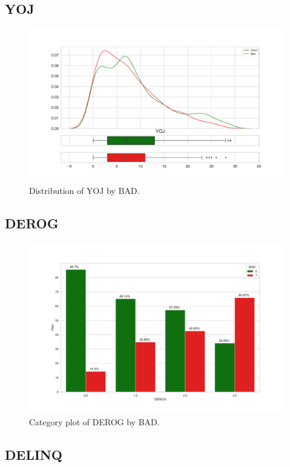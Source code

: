 \subsection*{YOJ}

\begin{figure}[!ht]
	\centering
	\includegraphics[scale=0.40]{figs/yoj_dist.pdf}
	\caption{Distribution of YOJ by BAD. \label{yoj_dist}}
\end{figure}

\subsection*{DEROG}

\begin{figure}[!ht]
	\centering
	\includegraphics[scale=0.40]{figs/derog_cat.pdf}
	\caption{Category plot of DEROG by BAD. \label{derog_cat}}
\end{figure}

\subsection*{DELINQ}

